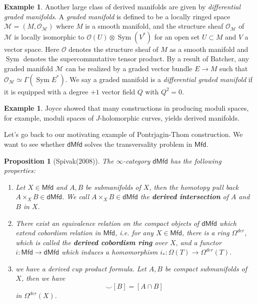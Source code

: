 \documentclass[11pt]{amsart}
\numberwithin{equation}{section}
\newtheorem{prop}[thm]{Proposition}
\theoremstyle{definition}
\newtheorem{example}[thm]{Example}
\theoremstyle{remark}
\numberwithin{equation}{section}
\newcommand{\CO}{{\mathcal O}}
\newcommand{\mfd}{\mathsf{Mfd}}
\newcommand{\dmfd}{\mathsf{dMfd}}
\newcommand{\sym}{\operatorname{Sym}}
\begin{document}
\begin{example}
	Another large class of derived manifolds are given by {\it differential graded manifolds}. 
	A {\it graded manifold} is defined to be a locally ringed space $\mathcal{M}=(M,\CO_{\mathcal{M}})$ where $M$ is a smooth manifold, and the structure sheaf $\CO_{\mathcal{M}}$ of $\mathcal{M}$ is locally isomorphic to $\CO(U)\otimes \sym (V^*)$ for an open set $U\subset M$ and $V$ a vector space. Here $\CO$ denotes the structure sheaf of $M$ as a smooth manifold and $\sym$ denotes the supercommutative tensor product. By a result of Batcher, any graded manifold $\mathcal{M}$ can be realized by a graded vector bundle $E\to M$ such that $\CO_{\mathcal{M}} \simeq \Gamma (\sym E^*)$. We say a graded manifold is a {\it differential graded manifold} if it is equipped with a degree $+1$ vector field $Q$ with $Q^2=0$.
\end{example}

\begin{example}
	Joyce showed that many constructions in producing moduli spaces, for example, moduli spaces of $J$-holomorphic curves, yields derived manifolds. 
\end{example}

Let's go back to our motivating example of Pontrjagin-Thom construction. We want to see whether $\dmfd$ solves the transversality problem in $\mfd$. 
\begin{prop}[Spivak(2008)]
	The $\infty$-category $\dmfd$ has the following properties:
	\begin{enumerate}
		\item Let $X\in \mfd$ and $A,B$ be submanifolds of $X$, then the homotopy pull back $A\times_X B\in \dmfd$. We call $A\times_X B\in \dmfd$ the {\bf derived intersection} of $A$ and $B$ in $X$.
		\item There exist an equivalence relation on the compact objects of $\dmfd$ which extend cobordism relation in $\mfd$, i.e. for any $X\in \mfd$, there is a ring $\Omega^{der}$, which is called the {\bf derived cobordism ring} over $X$, and a functor $i: \mfd \to \dmfd$ which induces a homomorphism $i_*: \Omega(T) \to \Omega^{der}(T)$.
		\item we have a derived cup product formula. Let $A,B$ be compact submanifolds of $X$, then we have
		\begin{equation*}
		[A]\smile[B] =[A\cap B]
		\end{equation*}
		in $\Omega^{der}(X)$.
	\end{enumerate}
\end{prop}
\end{document}
